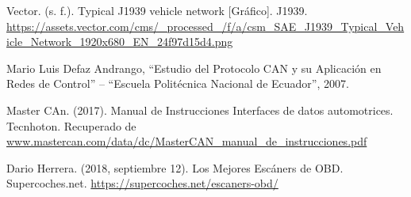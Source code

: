 \begin{thebibliography}{99}
 Vector. (s. f.). Typical J1939 vehicle network [Gráfico]. J1939. \url{https://assets.vector.com/cms/_processed_/f/a/csm_SAE_J1939_Typical_Vehicle_Network_1920x680_EN_24f97d15d4.png}

 Mario Luis Defaz Andrango, “Estudio del Protocolo CAN y su Aplicación en Redes de Control” – “Escuela Politécnica Nacional de Ecuador”, 2007.

 Master CAn. (2017). Manual de Instrucciones Interfaces de datos automotrices. Tecnhoton. Recuperado de  \url{www.mastercan.com/data/dc/MasterCAN_manual_de_instrucciones.pdf}

 Dario Herrera. (2018, septiembre 12). Los Mejores Escáners de OBD. Supercoches.net. \url{https://supercoches.net/escaners-obd/}














\end{thebibliography}
